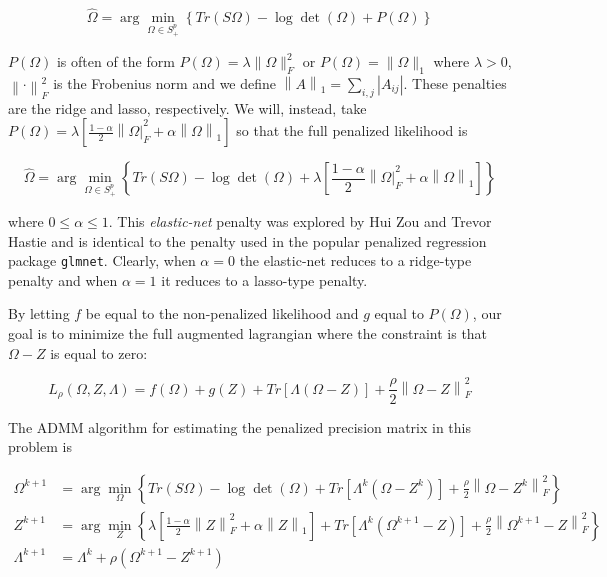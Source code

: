 \documentclass[11pt,]{book}
\theoremstyle{definition}
\theoremstyle{definition}
\theoremstyle{definition}
\theoremstyle{remark}
\begin{document}
\[ \hat{\Omega} = \arg\min_{\Omega \in S_{+}^{p}}\left\{ Tr\left(S\Omega\right) - \log \det\left(\Omega \right) + P\left( \Omega \right) \right\} \]

\(P\left( \Omega \right)\) is often of the form
\(P\left(\Omega \right) = \lambda\|\Omega \|_{F}^{2}\) or
\(P\left(\Omega \right) = \|\Omega\|_{1}\) where \(\lambda > 0\),
\(\left\|\cdot \right\|_{F}^{2}\) is the Frobenius norm and we define
\(\left\|A \right\|_{1} = \sum_{i, j} \left| A_{ij} \right|\). These
penalties are the ridge and lasso, respectively. We will, instead, take
\(P\left( \Omega \right) = \lambda\left[\frac{1 - \alpha}{2}\left\| \Omega \right|_{F}^{2} + \alpha\left\| \Omega \right\|_{1} \right]\)
so that the full penalized likelihood is

\[ \hat{\Omega} = \arg\min_{\Omega \in S_{+}^{p}}\left\{ Tr\left(S\Omega\right) - \log \det\left(\Omega \right) + \lambda\left[\frac{1 - \alpha}{2}\left\| \Omega \right|_{F}^{2} + \alpha\left\| \Omega \right\|_{1} \right] \right\} \]

where \(0 \leq \alpha \leq 1\). This \emph{elastic-net} penalty was
explored by Hui Zou and Trevor Hastie \citep{zou2005regularization} and
is identical to the penalty used in the popular penalized regression
package \texttt{glmnet}. Clearly, when \(\alpha = 0\) the elastic-net
reduces to a ridge-type penalty and when \(\alpha = 1\) it reduces to a
lasso-type penalty.

By letting \(f\) be equal to the non-penalized likelihood and \(g\)
equal to \(P\left( \Omega \right)\), our goal is to minimize the full
augmented lagrangian where the constraint is that \(\Omega - Z\) is
equal to zero:

\[ L_{\rho}(\Omega, Z, \Lambda) = f\left(\Omega\right) + g\left(Z\right) + Tr\left[\Lambda\left(\Omega - Z\right)\right] + \frac{\rho}{2}\left\|\Omega - Z\right\|_{F}^{2} \]

The ADMM algorithm for estimating the penalized precision matrix in this
problem is

\begin{align}
  \Omega^{k + 1} &= \arg\min_{\Omega}\left\{ Tr\left(S\Omega\right) - \log\det\left(\Omega\right) + Tr\left[\Lambda^{k}\left(\Omega - Z^{k}\right)\right] + \frac{\rho}{2}\left\| \Omega - Z^{k} \right\|_{F}^{2} \right\} \\
  Z^{k + 1} &= \arg\min_{Z}\left\{ \lambda\left[ \frac{1 - \alpha}{2}\left\| Z \right\|_{F}^{2} + \alpha\left\| Z \right\|_{1} \right] + Tr\left[\Lambda^{k}\left(\Omega^{k + 1} - Z\right)\right] + \frac{\rho}{2}\left\| \Omega^{k + 1} - Z \right\|_{F}^{2} \right\} \\
  \Lambda^{k + 1} &= \Lambda^{k} + \rho\left( \Omega^{k + 1} - Z^{k + 1} \right)
\end{align}
\end{document}
